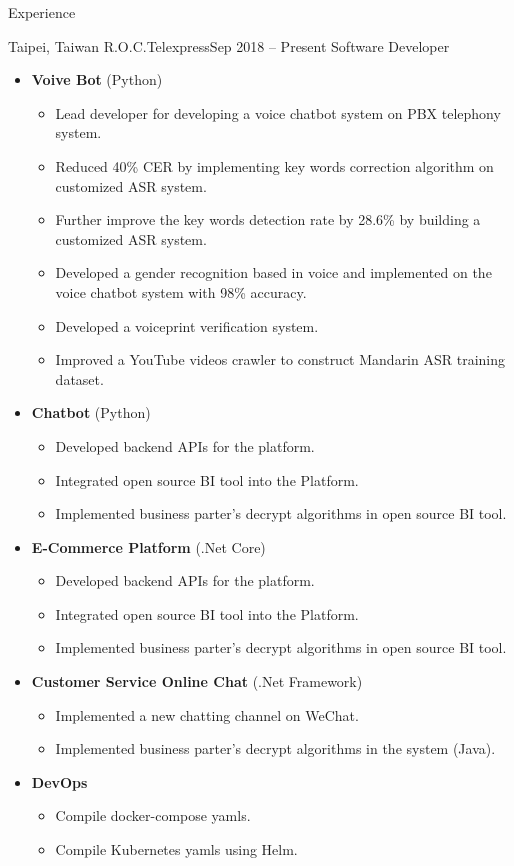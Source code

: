 \documentclass[]{mcdowellcv}
\begin{document}
\makeheader
      

\begin{cvsection}{Experience}
	\begin{cvsubsection}{Taipei, Taiwan R.O.C.}{Telexpress}{Sep 2018 -- Present}
		Software Developer
		\begin{itemize}
			\item \textbf{Voive Bot} (Python)
				\begin{itemize}%
					\item Lead developer for developing a voice chatbot system on PBX telephony system.
					\item Reduced 40\% CER by implementing key words correction algorithm on customized ASR system.
					\item Further improve the key words detection rate by 28.6\% by building a customized ASR system.
					\item Developed a gender recognition based in voice and implemented on the voice chatbot system with 98\% accuracy.
					\item Developed a voiceprint verification system.
					\item Improved a YouTube videos crawler to construct Mandarin ASR training dataset.
				\end{itemize}
			\item \textbf{Chatbot} (Python)
				\begin{itemize}%
					\item Developed backend APIs for the platform.
					\item Integrated open source BI tool into the Platform.
					\item Implemented business parter's decrypt algorithms in open source BI tool.
				\end{itemize}
			\item \textbf{E-Commerce Platform} (.Net Core)						
				\begin{itemize}%
					\item Developed backend APIs for the platform.
					\item Integrated open source BI tool into the Platform.
					\item Implemented business parter's decrypt algorithms in open source BI tool.
				\end{itemize}
			\item \textbf{Customer Service Online Chat} (.Net Framework)	
				\begin{itemize}%
					\item Implemented a new chatting channel on WeChat.
					\item Implemented business parter's decrypt algorithms in the system (Java).
				\end{itemize}
			\item \textbf{DevOps}
				\begin{itemize}%
					\item Compile docker-compose yamls.
					\item Compile Kubernetes yamls using Helm.
				\end{itemize}
		\end{itemize}
	\end{cvsubsection}
\end{cvsection}
\end{document}
